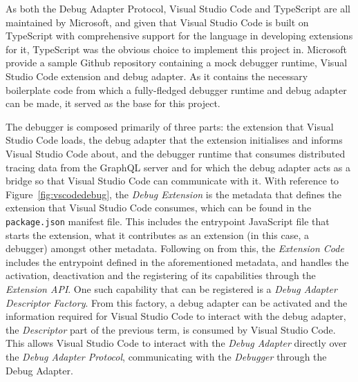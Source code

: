 \documentclass[12pt,pdftex,titlepage]{report}
\begin{document}
            As both the Debug Adapter Protocol, Visual Studio Code and TypeScript are all maintained by Microsoft, and given that Visual Studio Code is built on TypeScript with comprehensive support for the language
            in developing extensions for it, TypeScript was the obvious choice to implement this project in. Microsoft provide a sample Github repository containing a mock debugger runtime, Visual Studio Code extension
            and debug adapter. As it contains the necessary boilerplate code from which a fully-fledged debugger runtime and debug adapter can be made, it served as the base for this project.

            The debugger is composed primarily of three parts: the extension that Visual Studio Code loads, the debug adapter that the extension initialises and informs Visual Studio Code about, and the debugger runtime
            that consumes distributed tracing data from the GraphQL server and for which the debug adapter acts as a bridge so that Visual Studio Code can communicate with it. With reference to Figure~\ref{fig:vscodedebug},
            the \textit{Debug Extension} is the metadata that defines the extension that Visual Studio Code consumes, which can be found in the \texttt{package.json} manifest file. This includes the entrypoint JavaScript file 
            that starts the extension, what it contributes as an extension (in this case, a debugger) amongst other metadata. Following on from this, the \textit{Extension Code} includes the entrypoint defined in the 
            aforementioned metadata, and handles the activation, deactivation and the registering of its capabilities through the \textit{Extension API}. One such capability that can be registered is a \textit{Debug Adapter 
            Descriptor Factory}. From this factory, a debug adapter can be activated and the information required for Visual Studio Code to interact with the debug adapter, the \textit{Descriptor} part of the previous term, 
            is consumed by Visual Studio Code. This allows Visual Studio Code to interact with the \textit{Debug Adapter} directly over the \textit{Debug Adapter Protocol}, communicating with the \textit{Debugger} through the 
            Debug Adapter.
\end{document}
